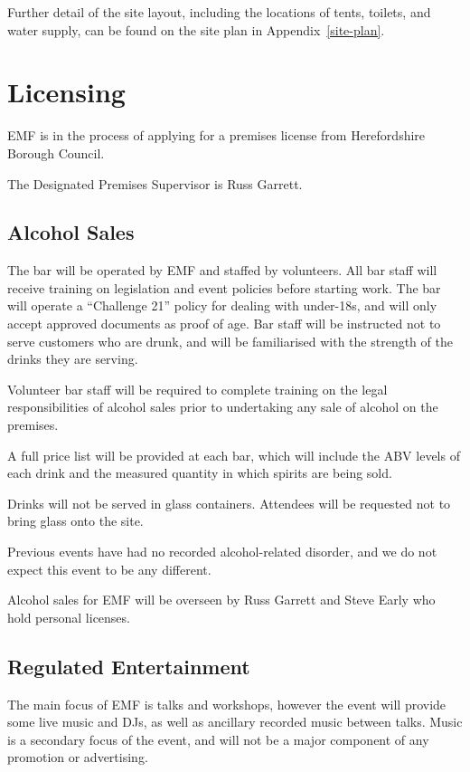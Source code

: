 Further detail of the site layout, including the locations of tents, toilets,
and water supply, can be found on the site plan in Appendix~\ref{site-plan}.

\section{Licensing}

EMF is in the process of applying for a premises license from Herefordshire
Borough Council.

The Designated Premises Supervisor is Russ Garrett.

\subsection{Alcohol Sales}

The bar will be operated by EMF and staffed by volunteers. All bar staff will
receive training on legislation and event policies before starting work. The
bar will operate a ``Challenge 21'' policy for dealing with under-18s, and will
only accept approved documents as proof of age. Bar staff will be instructed
not to serve customers who are drunk, and will be familiarised with the
strength of the drinks they are serving.

Volunteer bar staff will be required to complete training on the legal
responsibilities of alcohol sales prior to undertaking any sale of alcohol
on the premises.

A full price list will be provided at each bar, which will include the ABV
levels of each drink and the measured quantity in which spirits are being sold.

Drinks will not be served in glass containers. Attendees will be requested not to
bring glass onto the site.

Previous events have had no recorded alcohol-related disorder, and we do not
expect this event to be any different.

Alcohol sales for EMF will be overseen by Russ Garrett and Steve Early who
hold personal licenses.

\subsection{Regulated Entertainment}

The main focus of EMF is talks and workshops, however the event will provide
some live music and DJs, as well as ancillary recorded music between talks.
Music is a secondary focus of the event, and will not be a major component of
any promotion or advertising.

